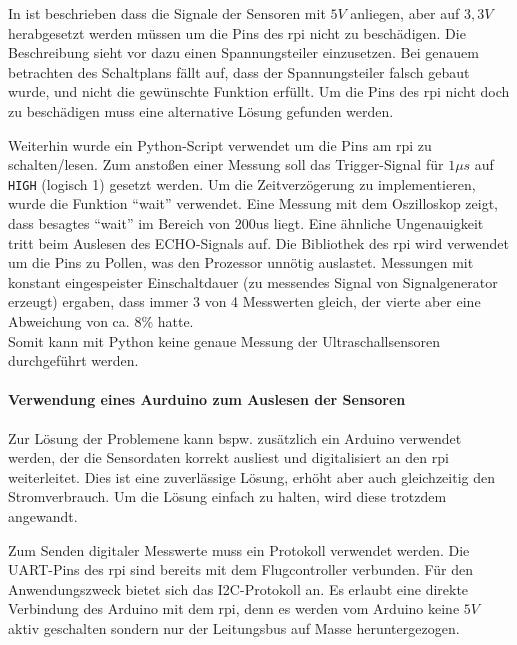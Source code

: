 In \cite[Kapitel 4.3.9]{wirthErweiterungBestehendenDrohne2022} ist beschrieben dass die Signale der Sensoren mit $5V$ anliegen, aber auf $3,3V$ herabgesetzt werden müssen um die Pins des \gls{rpi} nicht zu beschädigen.
Die Beschreibung sieht vor dazu einen Spannungsteiler einzusetzen. Bei genauem betrachten des Schaltplans fällt auf, dass der Spannungsteiler falsch gebaut wurde, und nicht die gewünschte Funktion erfüllt. Um die Pins des \gls{rpi} nicht doch zu beschädigen muss eine alternative Lösung gefunden werden. 

Weiterhin wurde ein Python-Script verwendet um die Pins am \gls{rpi} zu schalten/lesen. 
Zum anstoßen einer Messung soll das Trigger-Signal für $1\mu s$ auf \texttt{HIGH} (logisch 1) gesetzt werden. Um die Zeitverzögerung zu implementieren, wurde die Funktion \enquote{wait} verwendet. Eine Messung mit dem Oszilloskop zeigt, dass besagtes \enquote{wait} im Bereich von 200us liegt.\newline
Eine ähnliche Ungenauigkeit tritt beim Auslesen des ECHO-Signals auf. Die Bibliothek des \gls{rpi} wird verwendet um die Pins zu Pollen, was den Prozessor unnötig auslastet. Messungen mit konstant eingespeister Einschaltdauer (zu messendes Signal von Signalgenerator erzeugt) ergaben, dass immer 3 von 4 Messwerten gleich, der vierte aber eine Abweichung von ca. 8\% hatte.\\
Somit kann mit Python keine genaue Messung der Ultraschallsensoren durchgeführt werden. 

\paragraph*{Verwendung eines Aurduino zum Auslesen der Sensoren}
Zur Lösung der Problemene kann bspw. zusätzlich ein Arduino verwendet werden, der die Sensordaten korrekt ausliest und digitalisiert an den \gls{rpi} weiterleitet. Dies ist eine zuverlässige Lösung, erhöht aber auch gleichzeitig den Stromverbrauch. Um die Lösung einfach zu halten, wird diese trotzdem angewandt.

Zum Senden digitaler Messwerte muss ein Protokoll verwendet werden. Die UART-Pins des \gls{rpi} sind bereits mit dem Flugcontroller verbunden. Für den Anwendungszweck bietet sich das I2C-Protokoll an. Es erlaubt eine direkte Verbindung des Arduino mit dem \gls{rpi}, denn es werden vom Arduino keine $5V$ aktiv geschalten sondern nur der Leitungsbus auf Masse heruntergezogen.

